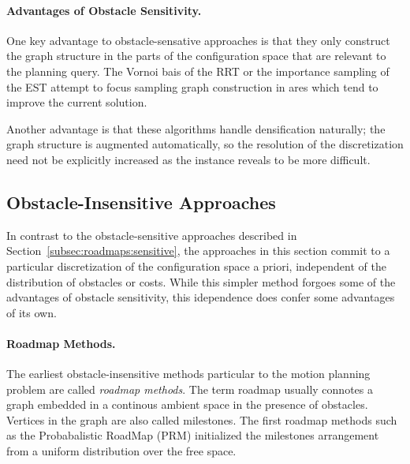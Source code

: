 \paragraph{Advantages of Obstacle Sensitivity.}
One key advantage to obstacle-sensative approaches is that
they only construct the graph structure in the parts of the
configuration space that are relevant to the planning query.
The Vornoi bais of the RRT or the importance sampling of the EST
attempt to focus sampling graph construction in ares
which tend to improve the current solution.

Another advantage is that these algorithms handle densification
naturally;
the graph structure is augmented automatically,
so the resolution of the discretization need not be explicitly
increased as the instance reveals to be more difficult.





\subsection{Obstacle-Insensitive Approaches}

In contrast to the obstacle-sensitive approaches described in
Section~\ref{subsec:roadmaps:sensitive},
the approaches in this section commit to a particular discretization
of the configuration space a priori,
independent of the distribution of obstacles or costs.
While this simpler method forgoes some of the advantages of
obstacle sensitivity,
this idependence does confer some advantages of its own.

\paragraph{Roadmap Methods.}

The earliest obstacle-insensitive methods particular to the motion
planning problem are called \emph{roadmap methods}.
The term roadmap usually connotes a graph embedded in a continous
ambient space in the presence of obstacles.
Vertices in the graph are also called milestones.
The first roadmap methods such as the
Probabalistic RoadMap (PRM) \citep{kavrakietal1996prm}
initialized the milestones arrangement
from a uniform distribution over the free space.

